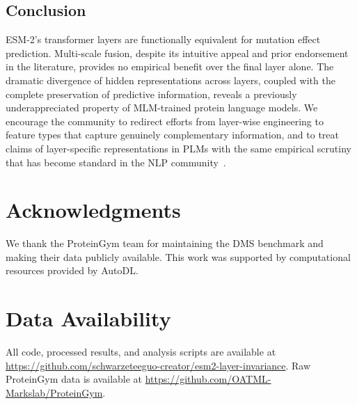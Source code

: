 \documentclass[11pt,a4paper]{article}
\begin{document}
\subsection{Conclusion}

ESM-2's transformer layers are functionally equivalent for mutation effect
prediction. Multi-scale fusion, despite its intuitive appeal and prior endorsement
in the literature, provides no empirical benefit over the final layer alone. The
dramatic divergence of hidden representations across layers, coupled with the
complete preservation of predictive information, reveals a previously
underappreciated property of MLM-trained protein language models. We encourage
the community to redirect efforts from layer-wise engineering to feature types
that capture genuinely complementary information, and to treat claims of
layer-specific representations in PLMs with the same empirical scrutiny that
has become standard in the NLP community~\cite{rogers2021bertology}.

\section*{Acknowledgments}
We thank the ProteinGym team for maintaining the DMS benchmark and making
their data publicly available. This work was supported by computational
resources provided by AutoDL.

\section*{Data Availability}
All code, processed results, and analysis scripts are available at
\url{https://github.com/schwarzeteeguo-creator/esm2-layer-invariance}. Raw ProteinGym data is available at
\url{https://github.com/OATML-Markslab/ProteinGym}.
\end{document}
